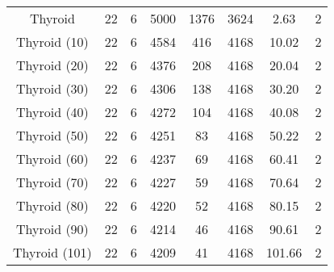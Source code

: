 \begin{longtable}{cccccccc}
           Thyroid &      22 &           6 &  5000 &       1376 &       3624 &   2.63 &        2 \\
      Thyroid (10) &      22 &           6 &  4584 &        416 &       4168 &  10.02 &        2 \\
      Thyroid (20) &      22 &           6 &  4376 &        208 &       4168 &  20.04 &        2 \\
      Thyroid (30) &      22 &           6 &  4306 &        138 &       4168 &  30.20 &        2 \\
      Thyroid (40) &      22 &           6 &  4272 &        104 &       4168 &  40.08 &        2 \\
      Thyroid (50) &      22 &           6 &  4251 &         83 &       4168 &  50.22 &        2 \\
      Thyroid (60) &      22 &           6 &  4237 &         69 &       4168 &  60.41 &        2 \\
      Thyroid (70) &      22 &           6 &  4227 &         59 &       4168 &  70.64 &        2 \\
      Thyroid (80) &      22 &           6 &  4220 &         52 &       4168 &  80.15 &        2 \\
      Thyroid (90) &      22 &           6 &  4214 &         46 &       4168 &  90.61 &        2 \\
     Thyroid (101) &      22 &           6 &  4209 &         41 &       4168 & 101.66 &        2 \\
\end{longtable}
